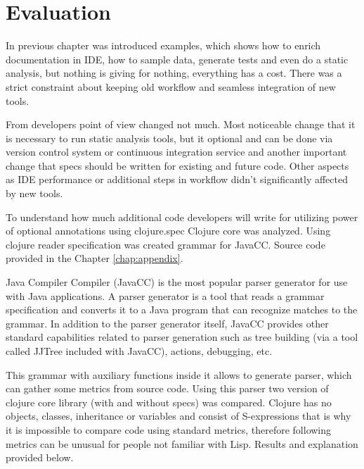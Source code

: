 \chapter{Evaluation}

\label{chap:evaluation}

In previous chapter was introduced examples, which shows how to enrich
documentation in IDE, how to sample data, generate tests and even do a static
analysis, but nothing is giving for nothing, everything has a cost. There was a
strict constraint about keeping old workflow and seamless integration of new
tools.

From developers point of view changed not much. Most noticeable change that it
is necessary to run static analysis tools, but it optional and can be done via
version control system or continuous integration service and another important
change that specs should be written for existing and future code. Other aspects
as IDE performance or additional steps in workflow didn't significantly affected
by new tools.

To understand how much additional code developers will write for utilizing power
of optional annotations using clojure.spec Clojure core was analyzed. Using
clojure reader specification \cite{readerspec} was created grammar for JavaCC.
Source code provided in the Chapter \ref{chap:appendix}.


Java Compiler Compiler (JavaCC) is the most popular parser generator for use
with Java applications. A parser generator is a tool that reads a grammar
specification and converts it to a Java program that can recognize matches to
the grammar. In addition to the parser generator itself, JavaCC provides other
standard capabilities related to parser generation such as tree building (via a
tool called JJTree included with JavaCC), actions, debugging, etc.

This grammar with auxiliary functions inside it allows to generate parser, which
can gather some metrics from source code. Using this parser two version of
clojure core library (with and without specs) was compared. Clojure has no
objects, classes, inheritance or variables and consist of S-expressions that is
why it is impossible to compare code using standard metrics, therefore following
metrics can be unusual for people not familiar with Lisp. Results and
explanation provided below.

